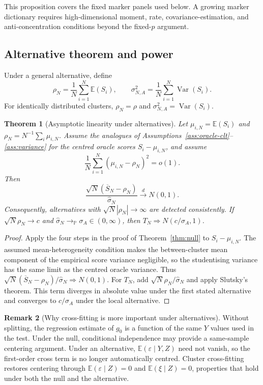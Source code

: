 \documentclass[11pt]{article}
\newtheorem{theorem}{Theorem}[section]
\theoremstyle{definition}
\newtheorem{remark}[theorem]{Remark}
\newcommand{\E}{\mathbb{E}}
\newcommand{\Var}{\operatorname{Var}}
\begin{document}
This proposition covers the fixed marker panels used below. A growing marker dictionary
requires high-dimensional moment, rate, covariance-estimation, and anti-concentration
conditions beyond the fixed-$p$ argument.

\subsection{Alternative theorem and power}

Under a general alternative, define
\[
\rho_N=\frac1N\sum_{i=1}^N\E(S_i),
\qquad
\sigma_{N,A}^2=\frac1N\sum_{i=1}^N\Var(S_i).
\]
For identically distributed clusters, $\rho_N=\rho$ and
$\sigma_{N,A}^2=\Var(S_i)$.

\begin{theorem}[Asymptotic linearity under alternatives]
\label{thm:alternative}
Let $\mu_{i,N}=\E(S_i)$ and $\rho_N=N^{-1}\sum_i\mu_{i,N}$. Assume the analogues of
Assumptions~\ref{ass:oracle-clt}--\ref{ass:variance} for the centred oracle scores
$S_i-\mu_{i,N}$, and assume
\[
\frac1N\sum_{i=1}^N(\mu_{i,N}-\rho_N)^2=o(1).
\]
Then
\[
\frac{\sqrt N(\overline S_N-\rho_N)}{\widehat\sigma_N}
\xrightarrow{d}N(0,1).
\]
Consequently, alternatives with $\sqrt N|\rho_N|\to\infty$ are detected consistently. If
$\sqrt N\rho_N\to c$ and $\widehat\sigma_N\to_{\mathbb P}\sigma_A\in(0,\infty)$, then
$T_N\Rightarrow N(c/\sigma_A,1)$.
\end{theorem}

\begin{proof}
Apply the four steps in the proof of Theorem~\ref{thm:null} to
$S_i-\mu_{i,N}$. The assumed mean-heterogeneity condition makes the between-cluster mean
component of the empirical score variance negligible, so the studentising variance has the
same limit as the centred oracle variance. Thus
$\sqrt N(\overline S_N-\rho_N)/\widehat\sigma_N\Rightarrow N(0,1)$.
For $T_N$, add $\sqrt N\rho_N/\widehat\sigma_N$ and apply Slutsky's theorem. This term
diverges in absolute value under the first stated alternative and converges to
$c/\sigma_A$ under the local alternative.
\end{proof}

\begin{remark}[Why cross-fitting is more important under alternatives]
Without splitting, the regression estimate of $g_0$ is a function of the same $Y$ values used
in the test. Under the null, conditional independence may provide a same-sample centering
argument. Under an alternative, $\E(\varepsilon\mid Y,Z)$ need not vanish, so the first-order
cross term is no longer automatically centred. Cluster cross-fitting restores centering through
$\E(\varepsilon\mid Z)=0$ and $\E(\xi\mid Z)=0$, properties that hold under both the null
and the alternative.
\end{remark}
\end{document}
